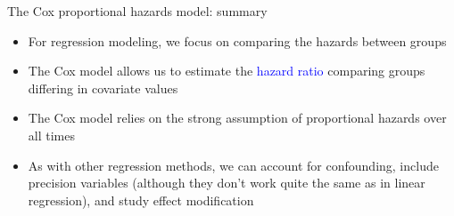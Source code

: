 \documentclass[10pt,t]{beamer}
\begin{document}
\begin{frame}{The Cox proportional hazards model: summary}
	\begin{itemize}
		\item For regression modeling, we focus on comparing the hazards between groups
		
		\medskip
		
		\item The Cox model allows us to estimate the \textcolor{blue}{hazard ratio} comparing groups differing in covariate values
		
		\medskip
		
		\item The Cox model relies on the strong assumption of proportional hazards over all times
		
		\medskip
		
		\item As with other regression methods, we can account for confounding, include precision variables (although they don't work quite the same as in linear regression), and study effect modification
	\end{itemize}
\end{frame}
%
%
\end{document}
